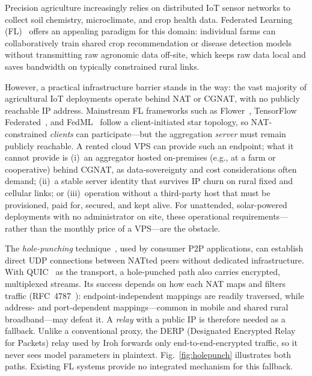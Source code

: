 \documentclass[a4paper,fleqn]{cas-dc}
\begin{document}
Precision agriculture increasingly relies on distributed IoT sensor networks to collect soil chemistry, microclimate, and crop health data. Federated Learning (FL)~\cite{mcmahan2017} offers an appealing paradigm for this domain: individual farms can collaboratively train shared crop recommendation or disease detection models without transmitting raw agronomic data off-site, which keeps raw data local and saves bandwidth on typically constrained rural links.

However, a practical infrastructure barrier stands in the way: the vast majority of agricultural IoT deployments operate behind NAT or CGNAT, with no publicly reachable IP address. Mainstream FL frameworks such as Flower~\cite{flower2022}, TensorFlow Federated~\cite{tff2019}, and FedML~\cite{fedml2020} follow a client-initiated star topology, so NAT-constrained \emph{clients} can participate---but the aggregation \emph{server} must remain publicly reachable. A rented cloud VPS can provide such an endpoint; what it cannot provide is (i)~an aggregator hosted on-premises (e.g., at a farm or cooperative) behind CGNAT, as data-sovereignty and cost considerations often demand; (ii)~a stable server identity that survives IP churn on rural fixed and cellular links; or (iii)~operation without a third-party host that must be provisioned, paid for, secured, and kept alive. For unattended, solar-powered deployments with no administrator on site, these operational requirements---rather than the monthly price of a VPS---are the obstacle.

The \emph{hole-punching} technique~\cite{ford2005}, used by consumer P2P applications, can establish direct UDP connections between NATted peers without dedicated infrastructure. With QUIC~\cite{rfc9000} as the transport, a hole-punched path also carries encrypted, multiplexed streams. Its success depends on how each NAT maps and filters traffic (RFC~4787~\cite{rfc4787}): endpoint-independent mappings are readily traversed, while address- and port-dependent mappings---common in mobile and shared rural broadband---may defeat it. A \emph{relay} with a public IP is therefore needed as a fallback. Unlike a conventional proxy, the DERP (Designated Encrypted Relay for Packets) relay used by Iroh forwards only end-to-end-encrypted traffic, so it never sees model parameters in plaintext. Fig.~\ref{fig:holepunch} illustrates both paths. Existing FL systems provide no integrated mechanism for this fallback.
\end{document}
